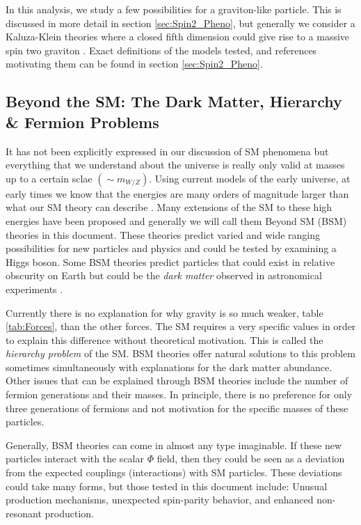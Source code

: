 In this analysis, we study a few possibilities for a graviton-like particle. This is discussed in more detail in section \ref{sec:Spin2_Pheno}, but generally we consider a Kaluza-Klein theories where a closed fifth dimension could give rise to a massive spin two graviton \cite{Klein:1926fj}. Exact definitions of the models tested, and references motivating them can be found in section \ref{sec:Spin2_Pheno}.


\subsection{Beyond the SM: The Dark Matter, Hierarchy \& Fermion Problems}
\label{sec:BSM}

It has not been explicitly expressed in our discussion of SM phenomena but everything that we understand about the universe is really only valid at masses up to a certain sclae $\left(\sim m_{W/Z}\right)$. Using current models of the early universe, at early times we know that the energies are many orders of magnitude larger than what our SM theory can describe \cite{Weinberg:1977ji}. Many extensions of the SM to these high energies have been proposed and generally we will call them Beyond SM (BSM) theories in this document. These theories predict varied and wide ranging possibilities for new particles and physics and could be tested by examining a Higgs boson. Some BSM theories predict particles that could exist in relative obscurity on Earth but could be the \textit{dark matter} observed in astronomical experiments \cite{Trimble:1987ee}. 

Currently there is no explanation for why gravity is so much weaker, table \ref{tab:Forces}, than the other forces. The SM requires a very specific values in order to explain this difference without theoretical motivation. This is called the \textit{hierarchy problem} of the SM.  BSM theories offer natural solutions to this problem sometimes simultaneously with explanations for the dark matter abundance. Other issues that can be explained through BSM theories include the number of fermion generations and their masses. In principle, there is no preference for only three generations of fermions and not motivation for the specific masses of these particles. 

Generally, BSM theories can come in almost any type imaginable. If these new particles interact with the scalar $\Phi$ field, then they could be seen as a deviation from the expected couplings (interactions) with SM particles. These deviations could take many forms, but those tested in this document include: Unusual production mechanisms, unexpected spin-parity behavior, and enhanced non-resonant production.
